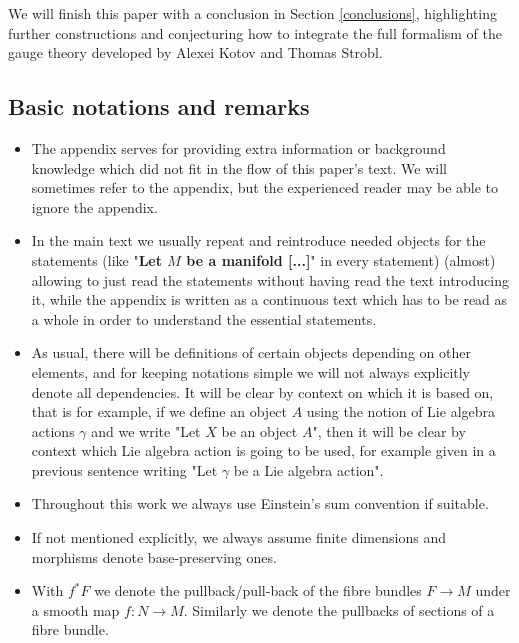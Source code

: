 \documentclass[a4paper,oneside,11pt,bibliography=totoc]{scrartcl}
\theoremstyle{plain}
\theoremstyle{remark}
\theoremstyle{definition}
\begin{document}
 We will finish this paper with a conclusion in Section \ref{conclusions}, highlighting further constructions and conjecturing how to integrate the full formalism of the gauge theory developed by Alexei Kotov and Thomas Strobl.

\subsection{Basic notations and remarks}\label{BasicNotations}

\begin{itemize}
	\item The appendix serves for providing extra information or background knowledge which did not fit in the flow of this paper's text. We will sometimes refer to the appendix, but the experienced reader may be able to ignore the appendix. 
	\item In the main text we usually repeat and reintroduce needed objects for the statements (like "\textbf{Let $M$ be a manifold [...]}" in every statement) (almost) allowing to just read the statements without having read the text introducing it, while the appendix is written as a continuous text which has to be read as a whole in order to understand the essential statements.
	\item As usual, there will be definitions of certain objects depending on other elements, and for keeping notations simple we will not always explicitly denote all dependencies. It will be clear by context on which it is based on, that is for example, if we define an object $A$ using the notion of Lie algebra actions $\gamma$ and we write "Let $X$ be an object $A$", then it will be clear by context which Lie algebra action is going to be used, for example given in a previous sentence writing "Let $\gamma$ be a Lie algebra action".
	\item Throughout this work we always use Einstein's sum convention if suitable.
	\item If not mentioned explicitly, we always assume finite dimensions and morphisms denote base-preserving ones.
	\item With $f^*F$ we denote the pullback/pull-back of the fibre bundles $F \to M$ under a smooth map $f: N \to M$. Similarly we denote the pullbacks of sections of a fibre bundle.

\end{itemize}
\end{document}
